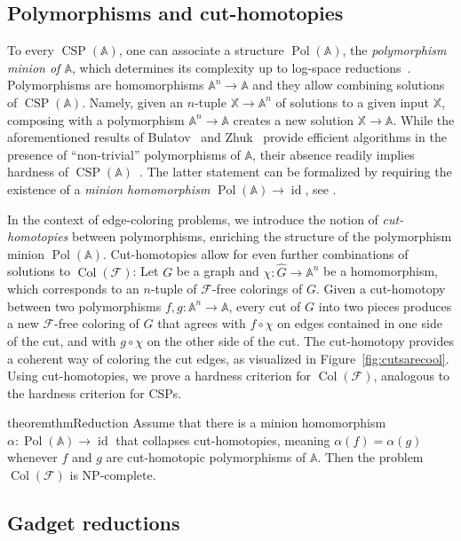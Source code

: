 \documentclass[oneside]{amsart}
\DeclareMathOperator{\col}{Col}
\newcommand{\str}[1]{\mathbb{#1}}
\newcommand{\cat}[1]{\mathcal{#1}}
\newcommand{\pol}{\operatorname{Pol}}
\newcommand{\CSP}{\operatorname{CSP}}
\newcommand{\Pol}{\operatorname{Pol}}
\DeclareMathOperator{\id}{id}
\begin{document}
\subsection{Polymorphisms and cut-homotopies}
To every $\CSP(\str A)$,
one can associate
a structure $\pol(\str A)$, the \emph{polymorphism minion of $\str A$}, which determines its complexity up to log-space reductions~\cite{pcspBible}.
Polymorphisms are homomorphisms $\str A^n \to \str A$ and they allow combining solutions of $\CSP(\str A)$. Namely, given an $n$-tuple $\str X\to \str A^n$ of solutions to a given input $\str X$, composing with a polymorphism $\str A^n \to \str A$ creates a new solution $\str X\to \str A$. 
While the aforementioned results of Bulatov~\cite{Bulatov} and Zhuk~\cite{ZhukFOCS,ZhukACM} provide efficient algorithms in the presence of ``non-trivial'' polymorphisms of $\str A$, their absence readily implies hardness of $\CSP(\str A)$~\cite{BulatovJeavonsKrokhin}.
The latter statement can be formalized by requiring the existence of a \emph{minion homomorphism} $\pol(\str A) \to \id$, see \cite{pcspBible,wonderlandOfAdjunctions}.

In the context of edge-coloring problems, we introduce the notion of \emph{cut-homo\-topies} between polymorphisms, enriching the structure of the polymorphism minion $\pol(\str A)$.
Cut-homotopies allow for even further combinations of solutions to $\col(\cat F)$: Let $G$ be a graph and $\chi\colon\hat G\to \str A^n$ be a homomorphism, which corresponds to an $n$-tuple of $\cat F$-free colorings of $G$.
Given a cut-homotopy between two polymorphisms $f,g\colon\str A^n\to\str A$, every cut of $G$ into two pieces produces a new $\cat F$-free coloring of $G$ that agrees with $f \circ \chi$ on edges contained in one side of the cut, and with $g \circ \chi$ on the other side of the cut. The cut-homotopy provides a coherent way of coloring the cut edges, as visualized in Figure~\ref{fig:cutsarecool}.  
Using cut-homotopies, we prove a hardness criterion for $\col(\cat F)$, analogous to the hardness criterion for CSPs.

\begin{restatable}{theorem}{thmReduction}
\label{thm:reduction}
    Assume that there is a minion homomorphism $\alpha\colon \Pol(\str A)\to \id$ that collapses cut-homotopies, meaning $\alpha(f)=\alpha(g)$ whenever $f$ and $g$ are cut-homotopic polymorphisms of $\str A$. Then the problem $\col(\cat F)$ is NP-complete.
\end{restatable}

\subsection{Gadget reductions}
\end{document}
